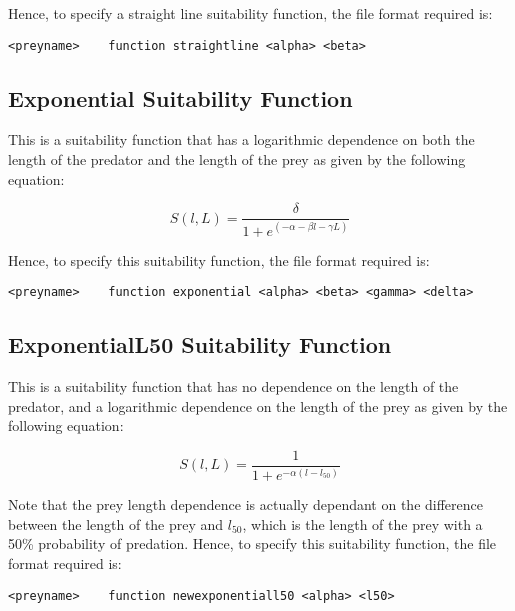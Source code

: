 \documentclass[]{book}
\begin{document}
Hence, to specify a straight line suitability function, the file format
required is:

\begin{verbatim}
<preyname>    function straightline <alpha> <beta>
\end{verbatim}

\hypertarget{exponential-suitability-function}{%
\subsection{Exponential Suitability Function}\label{exponential-suitability-function}}

This is a suitability function that has a logarithmic dependence on both
the length of the predator and the length of the prey as given by the
following equation:

\begin{equation}
\label{eq:expsuit}
S(l, L) = {\frac{\delta}{1 + e^{(- \alpha - \beta l - \gamma  L)}}}\end{equation}

Hence, to specify this suitability function, the file format required
is:

\begin{verbatim}
<preyname>    function exponential <alpha> <beta> <gamma> <delta>
\end{verbatim}

\hypertarget{exponentiall50-suitability-function}{%
\subsection{ExponentialL50 Suitability Function}\label{exponentiall50-suitability-function}}

This is a suitability function that has no dependence on the length of
the predator, and a logarithmic dependence on the length of the prey as
given by the following equation:

\begin{equation}
\label{eq:l50suit}
S(l, L) = { \frac{1}{1 + e^{ -\alpha (l - l_{50})}}}\end{equation}

Note that the prey length dependence is actually dependant on the
difference between the length of the prey and \(l_{50}\), which is the
length of the prey with a 50\% probability of predation. Hence, to
specify this suitability function, the file format required is:

\begin{verbatim}
<preyname>    function newexponentiall50 <alpha> <l50>
\end{verbatim}
\end{document}
